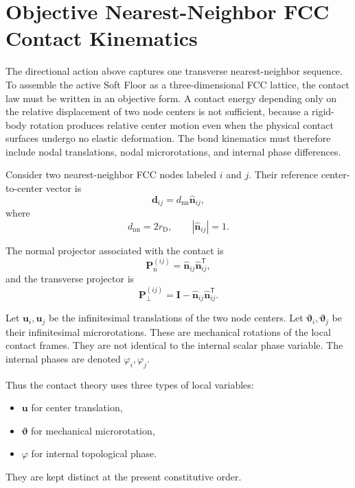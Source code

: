 \section{Objective Nearest-Neighbor FCC Contact Kinematics}

The directional action above captures one transverse nearest-neighbor sequence. To assemble the active Soft Floor as a three-dimensional FCC lattice, the contact law must be written in an objective form. A contact energy depending only on the relative displacement of two node centers is not sufficient, because a rigid-body rotation produces relative center motion even when the physical contact surfaces undergo no elastic deformation. The bond kinematics must therefore include nodal translations, nodal microrotations, and internal phase differences.

Consider two nearest-neighbor FCC nodes labeled $i$ and $j$. Their reference center-to-center vector is
\begin{equation}
    \mathbf{d}_{ij} = d_{\mathrm{nn}}\hat{\mathbf{n}}_{ij},
\end{equation}
where
\begin{equation}
    d_{\mathrm{nn}} = 2r_{\mathrm{D}}, \qquad |\hat{\mathbf{n}}_{ij}| = 1.
\end{equation}

The normal projector associated with the contact is
\begin{equation}
    \mathbf{P}_{\mathrm{n}}^{(ij)} = \hat{\mathbf{n}}_{ij}\hat{\mathbf{n}}_{ij}^{\mathsf{T}},
\end{equation}
and the transverse projector is
\begin{equation}
    \mathbf{P}_{\perp}^{(ij)} = \mathbf{I} - \hat{\mathbf{n}}_{ij}\hat{\mathbf{n}}_{ij}^{\mathsf{T}}.
\end{equation}

Let $\mathbf{u}_i, \mathbf{u}_j$ be the infinitesimal translations of the two node centers. Let $\boldsymbol{\vartheta}_i, \boldsymbol{\vartheta}_j$ be their infinitesimal microrotations. These are mechanical rotations of the local contact frames. They are not identical to the internal scalar phase variable. The internal phases are denoted $\varphi_i, \varphi_j$.

Thus the contact theory uses three types of local variables:
\begin{itemize}
    \item $\mathbf{u}$ for center translation,
    \item $\boldsymbol{\vartheta}$ for mechanical microrotation,
    \item $\varphi$ for internal topological phase.
\end{itemize}
They are kept distinct at the present constitutive order.

